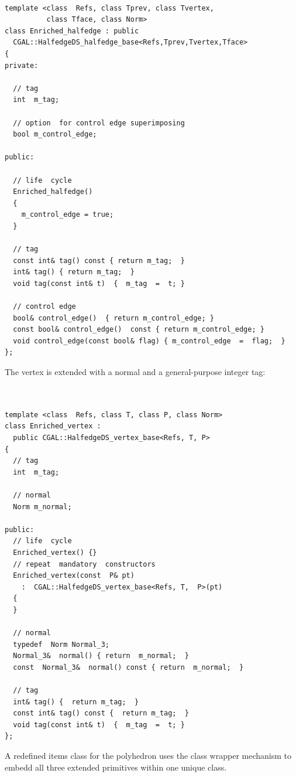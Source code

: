 \documentclass[letter,twoside,10pt]{article}
\begin{document}
{ \scriptsize
\begin{verbatim}

template <class  Refs, class Tprev, class Tvertex, 
          class Tface, class Norm>
class Enriched_halfedge : public 
  CGAL::HalfedgeDS_halfedge_base<Refs,Tprev,Tvertex,Tface>
{
private:

  // tag
  int  m_tag; 

  // option  for control edge superimposing
  bool m_control_edge; 

public:

  // life  cycle
  Enriched_halfedge()
  {
    m_control_edge = true;
  }

  // tag
  const int& tag() const { return m_tag;  }
  int& tag() { return m_tag;  }
  void tag(const int& t)  {  m_tag  =  t; }

  // control edge  
  bool& control_edge()  { return m_control_edge; }
  const bool& control_edge()  const { return m_control_edge; }
  void control_edge(const bool& flag) { m_control_edge  =  flag;  }
};

\end{verbatim}}

The vertex is extended with a normal and a general-purpose integer
tag:

{ \scriptsize
\begin{verbatim}


template <class  Refs, class T, class P, class Norm>
class Enriched_vertex :  
  public CGAL::HalfedgeDS_vertex_base<Refs, T, P>
{
  // tag
  int  m_tag; 

  // normal
  Norm m_normal;

public:
  // life  cycle
  Enriched_vertex() {}
  // repeat  mandatory  constructors
  Enriched_vertex(const  P& pt)
    :  CGAL::HalfedgeDS_vertex_base<Refs, T,  P>(pt)
  {
  }

  // normal
  typedef  Norm Normal_3;
  Normal_3&  normal() { return  m_normal;  }
  const  Normal_3&  normal() const { return  m_normal;  }

  // tag
  int& tag() {  return m_tag;  }
  const int& tag() const {  return m_tag;  }
  void tag(const int& t)  {  m_tag  =  t; }
};

\end{verbatim}}



A redefined items class for the polyhedron uses the class wrapper
mechanism to embedd all three extended primitives within one unique
class.
\end{document}
